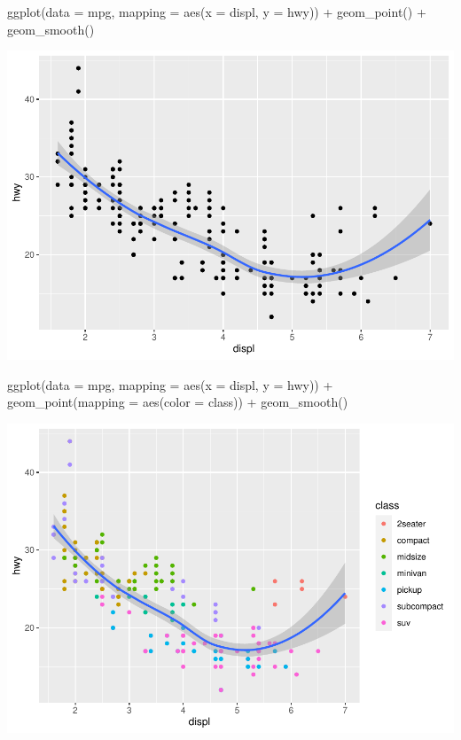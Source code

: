\documentclass[
]{article}
\newenvironment{Shaded}{\begin{snugshade}}{\end{snugshade}}
\newcommand{\AttributeTok}[1]{\textcolor[rgb]{0.77,0.63,0.00}{#1}}
\newcommand{\FunctionTok}[1]{\textcolor[rgb]{0.00,0.00,0.00}{#1}}
\newcommand{\NormalTok}[1]{#1}
\newcommand{\SpecialCharTok}[1]{\textcolor[rgb]{0.00,0.00,0.00}{#1}}
\begin{document}
\begin{Shaded}
\begin{Highlighting}[]
\FunctionTok{ggplot}\NormalTok{(}\AttributeTok{data =}\NormalTok{ mpg, }\AttributeTok{mapping =} \FunctionTok{aes}\NormalTok{(}\AttributeTok{x =}\NormalTok{ displ, }\AttributeTok{y =}\NormalTok{ hwy)) }\SpecialCharTok{+} 
  \FunctionTok{geom\_point}\NormalTok{() }\SpecialCharTok{+} 
  \FunctionTok{geom\_smooth}\NormalTok{()}
\end{Highlighting}
\end{Shaded}

\includegraphics{Journal_files/figure-latex/unnamed-chunk-49-2.pdf}

\begin{Shaded}
\begin{Highlighting}[]
\FunctionTok{ggplot}\NormalTok{(}\AttributeTok{data =}\NormalTok{ mpg, }\AttributeTok{mapping =} \FunctionTok{aes}\NormalTok{(}\AttributeTok{x =}\NormalTok{ displ, }\AttributeTok{y =}\NormalTok{ hwy)) }\SpecialCharTok{+} 
  \FunctionTok{geom\_point}\NormalTok{(}\AttributeTok{mapping =} \FunctionTok{aes}\NormalTok{(}\AttributeTok{color =}\NormalTok{ class)) }\SpecialCharTok{+} 
  \FunctionTok{geom\_smooth}\NormalTok{()}
\end{Highlighting}
\end{Shaded}

\includegraphics{Journal_files/figure-latex/unnamed-chunk-49-3.pdf}
\end{document}
